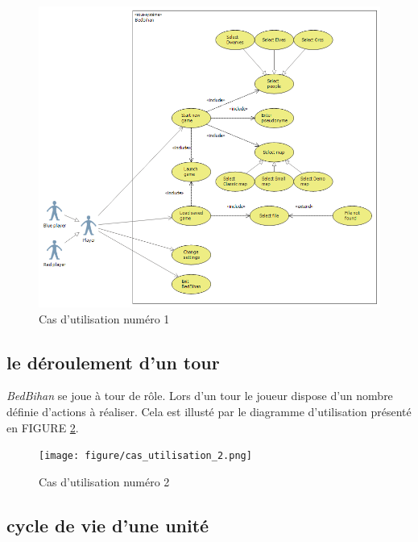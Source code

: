 		\begin{figure}
			\begin{center}
				\includegraphics[width=1\textwidth]{figure/cas_utilisation_1.png}
			\end{center}
			\caption{Cas d'utilisation numéro 1}
			\label{fig:use1}
		\end{figure}



	\subsection{le déroulement d'un tour}

		\emph{BedBihan} se joue à tour de rôle. Lors d'un tour le joueur dispose d'un nombre définie d'actions à réaliser. Cela est illusté par le diagramme d'utilisation présenté en FIGURE \ref{fig:use2}.

		\begin{figure}
			\begin{center}
				\texttt{[image: figure/cas\_utilisation\_2.png]}
			\end{center}
			\caption{Cas d'utilisation numéro 2}
			\label{fig:use2}
		\end{figure}

	\subsection{cycle de vie d'une unité}

